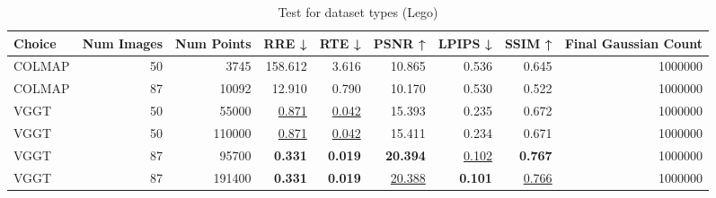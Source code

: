 \begin{table}[H]
\caption{Test for dataset types (Lego)}
\label{tab:99_dataset_type_lego}
\begin{tabular}{lrrrrrrrr}
\toprule
Choice & Num Images & Num Points & RRE ↓ & RTE ↓ & PSNR ↑ & LPIPS ↓ & SSIM ↑ & Final Gaussian Count \\
\midrule
COLMAP & 50 & 3745 & 158.612 & 3.616 & 10.865 & 0.536 & 0.645 & 1000000 \\
COLMAP & 87 & 10092 & 12.910 & 0.790 & 10.170 & 0.530 & 0.522 & 1000000 \\
VGGT & 50 & 55000 & \underline{0.871} & \underline{0.042} & 15.393 & 0.235 & 0.672 & 1000000 \\
VGGT & 50 & 110000 & \underline{0.871} & \underline{0.042} & 15.411 & 0.234 & 0.671 & 1000000 \\
VGGT & 87 & 95700 & \textbf{0.331} & \textbf{0.019} & \textbf{20.394} & \underline{0.102} & \textbf{0.767} & 1000000 \\
VGGT & 87 & 191400 & \textbf{0.331} & \textbf{0.019} & \underline{20.388} & \textbf{0.101} & \underline{0.766} & 1000000 \\
\bottomrule
\end{tabular}
\end{table}
